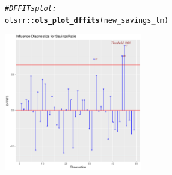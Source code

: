 \documentclass{article}\usepackage[]{graphicx}\usepackage[]{color}
\makeatletter
\newcommand{\hlcom}[1]{\textcolor[rgb]{0.678,0.584,0.686}{\textit{#1}}}%
\newcommand{\hlopt}[1]{\textcolor[rgb]{0,0,0}{#1}}%
\newcommand{\hlstd}[1]{\textcolor[rgb]{0.345,0.345,0.345}{#1}}%
\newcommand{\hlkwd}[1]{\textcolor[rgb]{0.737,0.353,0.396}{\textbf{#1}}}%
\newenvironment{kframe}{%
 \def\at@end@of@kframe{}%
 \ifinner\ifhmode%
  \def\at@end@of@kframe{\end{minipage}}%
  \begin{minipage}{\columnwidth}%
 \fi\fi%
 \def\FrameCommand##1{\hskip\@totalleftmargin \hskip-\fboxsep
 \colorbox{shadecolor}{##1}\hskip-\fboxsep
     \hskip-\linewidth \hskip-\@totalleftmargin \hskip\columnwidth}%
 \MakeFramed {\advance\hsize-\width
   \@totalleftmargin\z@ \linewidth\hsize
   \@setminipage}}%
 {\par\unskip\endMakeFramed%
 \at@end@of@kframe}
\newenvironment{knitrout}{}{} %
\makeatother
\begin{document}
\begin{knitrout}
\color{fgcolor}\begin{kframe}
\begin{alltt}
\hlcom{# DFFITs plot:}
\hlstd{olsrr}\hlopt{::}\hlkwd{ols_plot_dffits}\hlstd{(new_savings_lm)}
\end{alltt}
\end{kframe}

{\centering \includegraphics[width=0.45\textwidth]{figure/unnamed-chunk-11-1} 

}



\end{knitrout}

\newpage
\end{document}
